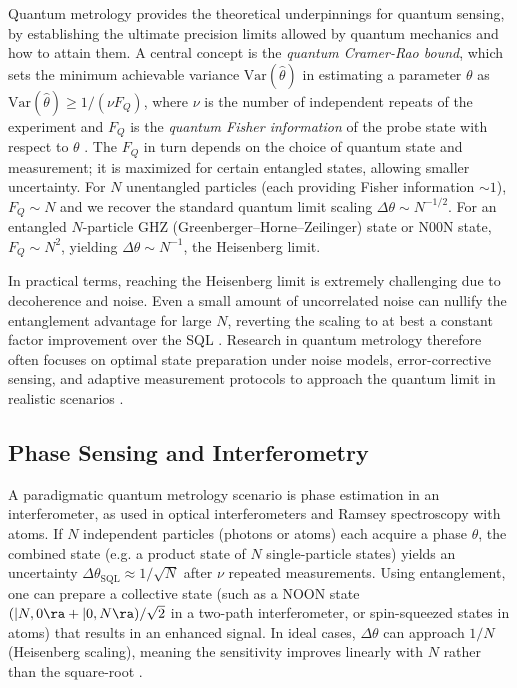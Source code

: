 Quantum metrology provides the theoretical underpinnings for quantum
sensing, by establishing the ultimate precision limits allowed by
quantum mechanics and how to attain them. A central concept is the
\emph{quantum Cramer-Rao bound}, which sets the minimum achievable
variance $\mathrm{Var}(\hat{\theta})$ in estimating a parameter
$\theta$ as $\mathrm{Var}(\hat{\theta}) \ge 1/(\nu F_Q)$, where $\nu$
is the number of independent repeats of the experiment and $F_Q$ is
the \emph{quantum Fisher information} of the probe state with respect
to $\theta$ . The $F_Q$ in turn depends on the choice of quantum state
and measurement; it is maximized for certain entangled states,
allowing smaller uncertainty. For $N$ unentangled particles (each
providing Fisher information $\sim 1$), $F_Q \sim N$ and we recover
the standard quantum limit scaling $\Delta \theta \sim N^{-1/2}$. For
an entangled $N$-particle GHZ (Greenberger–Horne–Zeilinger) state or
N00N state, $F_Q \sim N^2$, yielding $\Delta \theta \sim N^{-1}$, the
Heisenberg limit.


In practical terms, reaching the Heisenberg limit is extremely
challenging due to decoherence and noise. Even a small amount of
uncorrelated noise can nullify the entanglement advantage for large
$N$, reverting the scaling to at best a constant factor improvement
over the SQL . Research in quantum metrology therefore often focuses
on optimal state preparation under noise models, error-corrective
sensing, and adaptive measurement protocols to approach the quantum
limit in realistic scenarios .



\subsection{Phase Sensing and Interferometry}

A paradigmatic quantum metrology scenario is phase estimation in an
interferometer, as used in optical interferometers and Ramsey
spectroscopy with atoms. If $N$ independent particles (photons or
atoms) each acquire a phase $\theta$, the combined state (e.g. a
product state of $N$ single-particle states) yields an uncertainty
$\Delta\theta_{\text{SQL}} \approx 1/\sqrt{N}$ after $\nu$ repeated
measurements. Using entanglement, one can prepare a collective state
(such as a NOON state $(|N,0\ra + |0,N\ra)/\sqrt{2}$ in a two-path
interferometer, or spin-squeezed states in atoms) that results in an
enhanced signal. In ideal cases, $\Delta\theta$ can approach $1/N$
(Heisenberg scaling), meaning the sensitivity improves linearly with
$N$ rather than the square-root .



